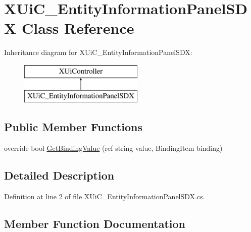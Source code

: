\hypertarget{class_x_ui_c___entity_information_panel_s_d_x}{}\section{X\+Ui\+C\+\_\+\+Entity\+Information\+Panel\+S\+DX Class Reference}
\label{class_x_ui_c___entity_information_panel_s_d_x}
Inheritance diagram for X\+Ui\+C\+\_\+\+Entity\+Information\+Panel\+S\+DX\+:\begin{figure}[H]
\begin{center}
\leavevmode
\includegraphics[height=2.000000cm]{df/d1f/class_x_ui_c___entity_information_panel_s_d_x}
\end{center}
\end{figure}
\subsection*{Public Member Functions}
\begin{DoxyCompactItemize}
\item 
override bool \mbox{\hyperlink{class_x_ui_c___entity_information_panel_s_d_x_af38693b5832bb3faff38aac2e7e27650}{Get\+Binding\+Value}} (ref string value, Binding\+Item binding)
\end{DoxyCompactItemize}


\subsection{Detailed Description}


Definition at line 2 of file X\+Ui\+C\+\_\+\+Entity\+Information\+Panel\+S\+D\+X.\+cs.



\subsection{Member Function Documentation}
\mbox{\label{class_x_ui_c___entity_information_panel_s_d_x_af38693b5832bb3faff38aac2e7e27650}} 
